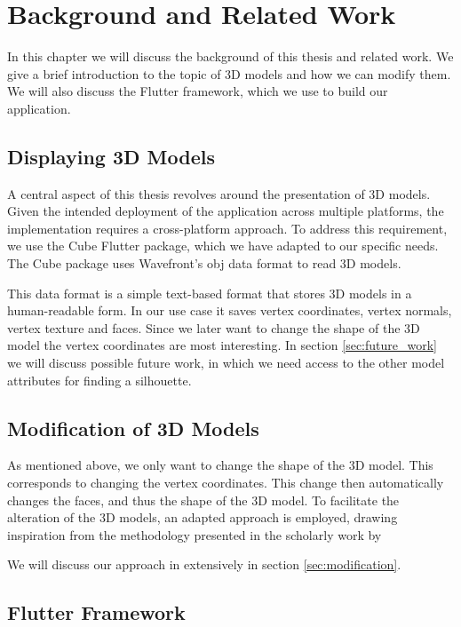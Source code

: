 \setcounter{chapter}{1}

\chapter{Background and Related Work}\label{ch02-related-work}

In this chapter we will discuss the background of this thesis and related work. We give a brief introduction to the topic of 3D models and how we can modify them. We will also discuss the Flutter framework, which we use to build our application.


\section{Displaying 3D Models}

A central aspect of this thesis revolves around the presentation of 3D models. Given the intended deployment of the application across multiple platforms, the implementation requires a cross-platform approach. 
To address this requirement, we use the Cube Flutter package, which we have adapted to our specific needs. The Cube package uses Wavefront's obj data format to read 3D models.

This data format is a simple text-based format that stores 3D models in a human-readable form. In our use case it saves vertex coordinates, vertex normals, vertex texture and faces. Since we later want to change
the shape of the 3D model the vertex coordinates are most interesting.
In section \ref{sec:future_work} we will discuss possible future work, in which we need access to the other model attributes for finding a silhouette.


\section{Modification of 3D Models}
As mentioned above, we only want to change the shape of the 3D model. This corresponds to changing the vertex coordinates. This change then automatically changes the faces, and thus the shape of the 3D model.
To facilitate the alteration of the 3D models, an adapted approach is employed, drawing inspiration from the methodology presented in the scholarly work by \cite{rychlik2008applications}

We will discuss our approach in extensively in section \ref{sec:modification}.

\section{Flutter Framework}

